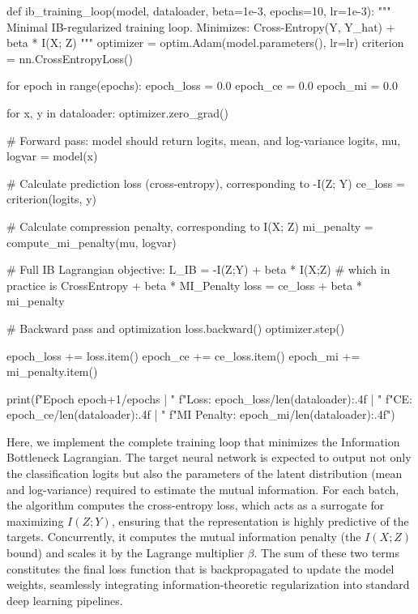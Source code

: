 \begin{pycode}
def ib_training_loop(model, dataloader, beta=1e-3, epochs=10, lr=1e-3):
    """
    Minimal IB-regularized training loop.
    Minimizes: Cross-Entropy(Y, Y_hat) + beta * I(X; Z)
    """
    optimizer = optim.Adam(model.parameters(), lr=lr)
    criterion = nn.CrossEntropyLoss()
    
    for epoch in range(epochs):
        epoch_loss = 0.0
        epoch_ce = 0.0
        epoch_mi = 0.0
        
        for x, y in dataloader:
            optimizer.zero_grad()
            
            # Forward pass: model should return logits, mean, and log-variance
            logits, mu, logvar = model(x)
            
            # Calculate prediction loss (cross-entropy), corresponding to -I(Z; Y)
            ce_loss = criterion(logits, y)
            
            # Calculate compression penalty, corresponding to I(X; Z)
            mi_penalty = compute_mi_penalty(mu, logvar)
            
            # Full IB Lagrangian objective: L_IB = -I(Z;Y) + beta * I(X;Z)
            # which in practice is CrossEntropy + beta * MI_Penalty
            loss = ce_loss + beta * mi_penalty
            
            # Backward pass and optimization
            loss.backward()
            optimizer.step()
            
            epoch_loss += loss.item()
            epoch_ce += ce_loss.item()
            epoch_mi += mi_penalty.item()
            
        print(f"Epoch {epoch+1}/{epochs} | "
              f"Loss: {epoch_loss/len(dataloader):.4f} | "
              f"CE: {epoch_ce/len(dataloader):.4f} | "
              f"MI Penalty: {epoch_mi/len(dataloader):.4f}")
\end{pycode}

Here, we implement the complete training loop that minimizes the Information Bottleneck Lagrangian. The target neural network is expected to output not only the classification logits but also the parameters of the latent distribution (mean and log-variance) required to estimate the mutual information. For each batch, the algorithm computes the cross-entropy loss, which acts as a surrogate for maximizing $I(Z; Y)$, ensuring that the representation is highly predictive of the targets. Concurrently, it computes the mutual information penalty (the $I(X; Z)$ bound) and scales it by the Lagrange multiplier $\beta$. The sum of these two terms constitutes the final loss function that is backpropagated to update the model weights, seamlessly integrating information-theoretic regularization into standard deep learning pipelines.
